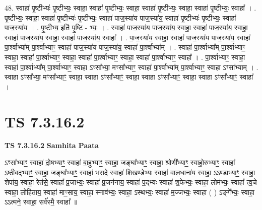 \documentclass[17pt]{extarticle}
\begin{document}
48. स्वाहा॑ पृ॒ष्टीभ्यः॑ पृ॒ष्टीभ्यः॒ स्वाहा॒ स्वाहा॑ पृ॒ष्टीभ्यः॒ स्वाहा॒ स्वाहा॑ पृ॒ष्टीभ्यः॒ स्वाहा॒ स्वाहा॑ पृ॒ष्टीभ्यः॒ स्वाहा᳚ । . पृ॒ष्टीभ्यः॒ स्वाहा॒ स्वाहा॑ पृ॒ष्टीभ्यः॑ पृ॒ष्टीभ्यः॒ स्वाहा॑ पाज॒स्या॑य पाज॒स्या॑य॒ स्वाहा॑ पृ॒ष्टीभ्यः॑ पृ॒ष्टीभ्यः॒ स्वाहा॑ पाज॒स्या॑य । . पृ॒ष्टीभ्य॒ इति॑ पृ॒ष्टि - भ्यः॒ । . स्वाहा॑ पाज॒स्या॑य पाज॒स्या॑य॒ स्वाहा॒ स्वाहा॑ पाज॒स्या॑य॒ स्वाहा॒ स्वाहा॑ पाज॒स्या॑य॒ स्वाहा॒ स्वाहा॑ पाज॒स्या॑य॒ स्वाहा᳚ । . पा॒ज॒स्या॑य॒ स्वाहा॒ स्वाहा॑ पाज॒स्या॑य पाज॒स्या॑य॒ स्वाहा॑ पा॒र्श्वाभ्या᳚म् पा॒र्श्वाभ्याꣳ॒॒ स्वाहा॑ पाज॒स्या॑य पाज॒स्या॑य॒ स्वाहा॑ पा॒र्श्वाभ्या᳚म् । . स्वाहा॑ पा॒र्श्वाभ्या᳚म् पा॒र्श्वाभ्याꣳ॒॒ स्वाहा॒ स्वाहा॑ पा॒र्श्वाभ्याꣳ॒॒ स्वाहा॒ स्वाहा॑ पा॒र्श्वाभ्याꣳ॒॒ स्वाहा॒ स्वाहा॑ पा॒र्श्वाभ्याꣳ॒॒ स्वाहा᳚ । . पा॒र्श्वाभ्याꣳ॒॒ स्वाहा॒ स्वाहा॑ पा॒र्श्वाभ्या᳚म् पा॒र्श्वाभ्याꣳ॒॒ स्वाहा ऽꣳसा᳚भ्या॒ मꣳसा᳚भ्याꣳ॒॒ स्वाहा॑ पा॒र्श्वाभ्या᳚म् पा॒र्श्वाभ्याꣳ॒॒ स्वाहा ऽꣳसा᳚भ्याम् । . स्वाहा ऽꣳसा᳚भ्या॒ मꣳसा᳚भ्याꣳ॒॒ स्वाहा॒ स्वाहा ऽꣳसा᳚भ्याꣳ॒॒ स्वाहा॒ स्वाहा ऽꣳसा᳚भ्याꣳ॒॒ स्वाहा॒ स्वाहा ऽꣳसा᳚भ्याꣳ॒॒ स्वाहा᳚ । \newline
\pagebreak
{}

\section{ TS 7.3.16.2 }

\textbf{TS 7.3.16.2 } \newline
\textbf{Samhita Paata} \newline

ऽꣳसा᳚भ्याꣳ॒॒ स्वाहा॑ दो॒षभ्याꣳ॒॒ स्वाहा॑ बा॒हुभ्याꣳ॒॒ स्वाहा॒ जङ्घा᳚भ्याꣳ॒॒ स्वाहा॒ श्रोणी᳚भ्याꣳ॒॒ स्वाहो॒रुभ्याꣳ॒॒ स्वाहा᳚ ऽष्ठी॒वद्भ्याꣳ॒॒ स्वाहा॒ जङ्घा᳚भ्याꣳ॒॒ स्वाहा॑ भ॒सदे॒ स्वाहा॑ शिख॒ण्डेभ्यः॒ स्वाहा॑ वाल॒धाना॑य॒ स्वाहा॒ ऽऽण्डाभ्याꣳ॒॒ स्वाहा॒ शेपा॑य॒ स्वाहा॒ रेत॑से॒ स्वाहा᳚ प्र॒जाभ्यः॒ स्वाहा᳚ प्र॒जन॑नाय॒ स्वाहा॑ प॒द्भ्यः स्वाहा॑ श॒फेभ्यः॒ स्वाहा॒ लोम॑भ्यः॒ स्वाहा᳚ त्व॒चे स्वाहा॒ लोहि॑ताय॒ स्वाहा॑ माꣳ॒॒साय॒ स्वाहा॒ स्नाव॑भ्यः॒ स्वाहा॒ ऽस्थभ्यः॒ स्वाहा॑ म॒ज्जभ्यः॒ स्वाहा ( ) ऽङ्गे᳚भ्यः॒ स्वाहा॒ ऽऽत्मने॒ स्वाहा॒ सर्व॑स्मै॒ स्वाहा᳚ ॥ \newline
\end{document}
